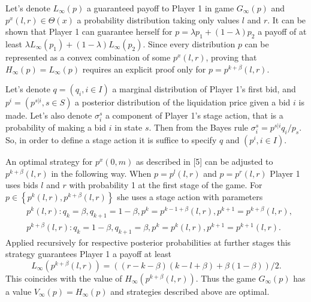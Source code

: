 Let's denote $L_\infty(p)$ a guaranteed payoff to Player 1 in game $G_\infty(p)$
and $p^x(l, r) \in \Theta(x)$ a probability distribution taking only values $l$
and $r$. It can be shown that Player 1 can guarantee herself for $p = \lambda
p_1 + (1-\lambda) p_2$ a payoff of at least $\lambda L_\infty(p_1) + (1-\lambda)
L_\infty(p_2)$. Since every distribution $p$ can be represented as a convex
combination of some $p^x(l,r)$, proving that $H_\infty(p) = L_\infty(p)$
requires an explicit proof only for $p = p^{k+\beta}(l, r)$.

Let's denote $q = (q_i, i \in I)$ a marginal distribution of Player 1's first
bid, and $p^i = (p^{s|i}, s \in S)$ a posterior distribution of the liquidation
price given a bid $i$ is made. Let's also denote $\sigma^s_i$ a component of
Player 1's stage action, that is a probability of making a bid $i$ in state $s$.
Then from the Bayes rule $\sigma^s_i = p^{s|i} q_i / p_s$. So, in order to
define a stage action it is suffice to specify $q$ and $(p^i, i \in I)$.

An optimal strategy for $p^x(0, m)$ as described in [5] can be adjusted to
$p^{k+\beta}(l, r)$ in the following way. When $p = p^l(l, r)$ and $p =
p^r(l,r)$ Player 1 uses bids $l$ and $r$ with probability 1 at the first stage
of the game. For $p \in \left\{ p^k(l, r), p^{k+\beta}(l,r) \right\}$ she uses a
stage action with parameters
\begin{align*}
  &p^k(l,r):
  q_k = \beta, q_{k+1} = 1-\beta, p^k = p^{k-1+\beta}(l,r), p^{k+1} = p^{k+\beta}(l,r),\\
  &p^{k+\beta}(l,r):
  q_k = 1-\beta, q_{k+1} = \beta, p^k = p^k(l,r), p^{k+1} = p^{k+1}(l,r).
\end{align*}
Applied recursively for respective posterior probabilities at further stages
this strategy guarantees Player 1 a payoff at least
\begin{equation*}
  L_\infty(p^{k+\beta}(l, r))
  = \left( (r - k - \beta)(k - l + \beta) + \beta(1-\beta) \right)/2.
\end{equation*}
This coincides with the value of $H_\infty(p^{k+\beta}(l, r))$. Thus the game
$G_\infty(p)$ has a value $V_\infty(p) = H_\infty(p)$ and strategies described
above are optimal.


